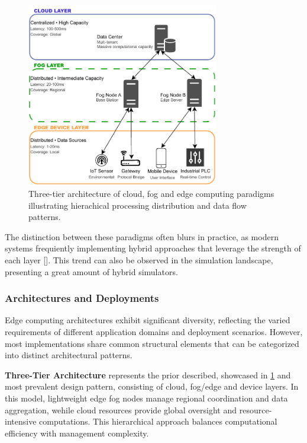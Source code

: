 \begin{figure}[H]
  \centering
  \includegraphics[width=0.75\textwidth]{img/edge_fog_cloud_diagram.pdf}
  \caption{Three-tier architecture of cloud, fog and edge computing paradigms illustrating hierachical processing distribution and data flow patterns.}
  \label{fig:edge-fog-cloud}
\end{figure}

The distinction between these paradigms often blurs in practice, as modern systems frequiently implementing hybrid approaches that leverage the strength of each layer [\cite{7488250}].
This trend can also be observed in the simulation landscape, presenting a great amount of hybrid simulators.
\subsubsection{Architectures and Deployments}
Edge computing architectures exhibit significant diversity, reflecting the varied requirements of different application domains and deployment scenarios.
However, most implementations share common structural elements that can be categorized into distinct architectural patterns.

\textbf{Three-Tier Architecture} represents the prior described, showcased in \ref{fig:edge-fog-cloud} and most prevalent design pattern, consisting of cloud, fog/edge and device layers.
In this model, lightweight edge fog nodes manage regional coordination and data aggregation, wehile cloud resources provide global oversight and resource-intensive computations.
This hierarchical approach balances computational efficiency with management complexity.

